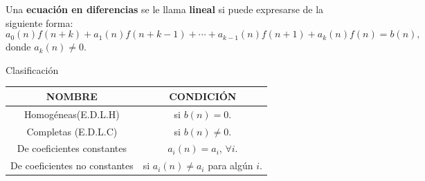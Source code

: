 \begin{frame}

\begin{definition}
	Una \textbf{ecuación en diferencias} se le llama \textbf{lineal}	  si puede expresarse de la siguiente forma:
	\begin{equation}\label{edl}
		a_{0}(n)f\left(n+k\right)+a_{1}(n)f\left(n+k-1\right)+\cdots+a_{k-1}(n)f\left(n+1\right)+a_{k}(n)f\left(n\right)=b\left(n\right), 
	\end{equation}
	donde $a_{k}(n)\neq0$.
\end{definition}

\begin{block}{Clasificación}
	\begin{table}[H]
		\centering
		\begin{tabular}{|c|c|}
		\hline
		\alert{NOMBRE} 								& \alert{CONDICIÓN}\\
		\hline
		Homogéneas(E.D.L.H)						& si $b(n)=0$.\\
		\hline
		Completas (E.D.L.C)						& si $b(n)\neq0$.\\
		\hline
		De coeficientes constantes		& $a_{i}(n)=a_{i}$, $\forall i$.\\
		\hline
		De coeficientes no constantes	& si $a_{i}(n)\neq a_{i}$ para algún $i$.\\
		\hline
		\end{tabular}
	\end{table}
\end{block}
\end{frame}

